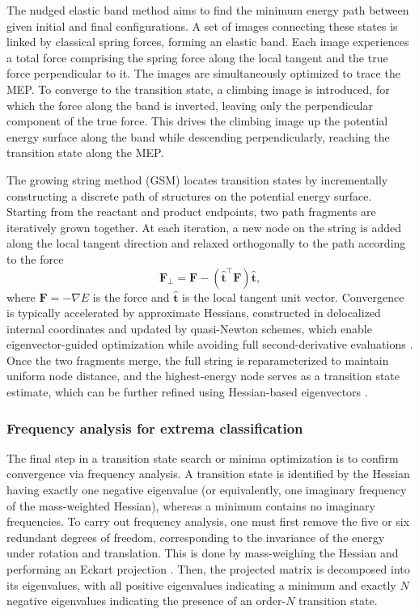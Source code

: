 \documentclass[pdflatex,sn-mathphys-num]{sn-jnl}%
\theoremstyle{thmstyleone}%
\theoremstyle{thmstyletwo}%
\theoremstyle{thmstylethree}%
\begin{document}
\begin{appendices}
The nudged elastic band method aims to find the minimum energy path between given initial and final configurations. A set of images connecting these states is linked by classical spring forces, forming an elastic band. Each image experiences a total force comprising the spring force along the local tangent and the true force perpendicular to it. The images are simultaneously optimized to trace the MEP. To converge to the transition state, a climbing image is introduced, for which the force along the band is inverted, leaving only the perpendicular component of the true force. This drives the climbing image up the potential energy surface along the band while descending perpendicularly, reaching the transition state along the MEP.

The growing string method (GSM) locates transition states by incrementally constructing a discrete path of structures on the potential energy surface. Starting from the reactant and product endpoints, two path fragments are iteratively grown together. At each iteration, a new node on the string is added along the local tangent direction and relaxed orthogonally to the path according to the force
\begin{equation}
\mathbf{F}_{\bot} = \mathbf{F} - (\hat{\mathbf{t}}^{\top} \mathbf{F}) \hat{\mathbf{t}},
\end{equation}
where $\mathbf{F} = -\nabla E$ is the force and $\hat{\mathbf{t}}$ is the local tangent unit vector. Convergence is typically accelerated by approximate Hessians, constructed in delocalized internal coordinates and updated by quasi-Newton schemes, which enable eigenvector-guided optimization while avoiding full second-derivative evaluations \citep{zimmerman2015}. Once the two fragments merge, the full string is reparameterized to maintain uniform node distance, and the highest-energy node serves as a transition state estimate, which can be further refined using Hessian-based eigenvectors \citep{peters2004}.

\subsubsection{Frequency analysis for extrema classification}
The final step in a transition state search or minima optimization is to confirm convergence via frequency analysis. A transition state is identified by the Hessian having exactly one negative eigenvalue (or equivalently, one imaginary frequency of the mass-weighted Hessian), whereas a minimum contains no imaginary frequencies. 
To carry out frequency analysis, one must first remove the five or six redundant degrees of freedom, corresponding to the invariance of the energy under rotation and translation. This is done by mass-weighing the Hessian and performing an Eckart projection \citep{louck1976}. Then, the projected matrix is decomposed into its eigenvalues, with all positive eigenvalues indicating a minimum and exactly $N$ negative eigenvalues indicating the presence of an order-$N$ transition state. 


\end{appendices}
\end{document}
